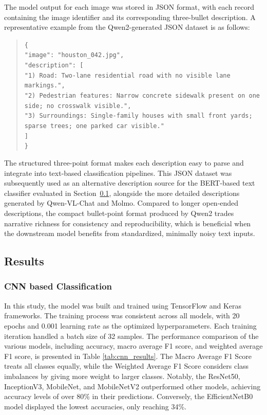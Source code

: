 \documentclass[11pt]{article}
\begin{document}
The model output for each image was stored in JSON format, with each record containing the image identifier and its corresponding three-bullet description. A representative example from the Qwen2-generated JSON dataset is as follows:

\begin{quote}
\texttt{\{\\
\hspace*{1em}"image": "houston\_042.jpg",\\
\hspace*{1em}"description": [\\
\hspace*{2em}"1) Road: Two-lane residential road with no visible lane markings.",\\
\hspace*{2em}"2) Pedestrian features: Narrow concrete sidewalk present on one side; no crosswalk visible.",\\
\hspace*{2em}"3) Surroundings: Single-family houses with small front yards; sparse trees; one parked car visible."\\
\hspace*{1em}]\\
\}
}
\end{quote}

The structured three-point format makes each description easy to parse and integrate into text-based classification pipelines. This JSON dataset was subsequently used as an alternative description source for the BERT-based text classifier evaluated in Section~\ref{sec:results}, alongside the more detailed descriptions generated by Qwen-VL-Chat and Molmo. Compared to longer open-ended descriptions, the compact bullet-point format produced by Qwen2 trades narrative richness for consistency and reproducibility, which is beneficial when the downstream model benefits from standardized, minimally noisy text inputs.

\subsection{Results}
\label{sec:results}

\subsubsection{CNN based Classification}
In this study, the model was built and trained using TensorFlow and Keras frameworks. The training process was consistent across all models, with 20 epochs and 0.001 learning rate as the optimized hyperparameters. Each training iteration handled a batch size of 32 samples. The performance comparison of the various models, including accuracy, macro average F1 score, and weighted average F1 score, is presented in Table \ref{tab:cnn_results}. The Macro Average F1 Score treats all classes equally, while the Weighted Average F1 Score considers class imbalances by giving more weight to larger classes. Notably, the ResNet50, InceptionV3, MobileNet, and MobileNetV2 outperformed other models, achieving accuracy levels of over 80\% in their predictions. Conversely, the EfficientNetB0 model displayed the lowest accuracies, only reaching 34\%.
\end{document}
